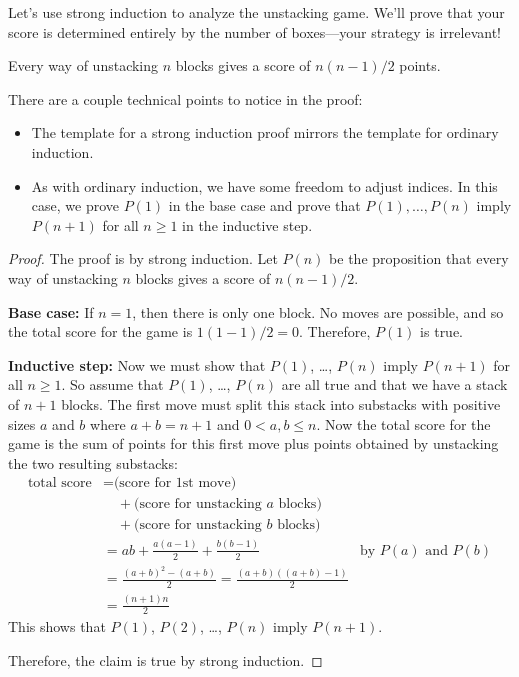 Let's use strong induction to analyze the unstacking game.  We'll prove
that your score is determined entirely by the number of boxes---your
strategy is irrelevant!

\begin{theorem}\label{stacking}
Every way of unstacking $n$ blocks gives a score of $n(n-1)/2$ points.
\end{theorem}

There are a couple technical points to notice in the proof:

\begin{itemize}

\item The template for a strong induction proof mirrors the template
for ordinary induction.

\item As with ordinary induction, we have some freedom to adjust indices.
In this case, we prove $P(1)$ in the base case and prove that $P(1),
\dots, P(n)$ imply $P(n+1)$ for all $n \geq 1$ in the inductive step.

\end{itemize}

\begin{proof}
The proof is by strong induction.  Let $P(n)$ be the proposition that
every way of unstacking $n$ blocks gives a score of $n(n-1)/2$.

\textbf{Base case:} If $n = 1$, then there is only one
block.  No moves are possible, and so the total score for the game is
$1(1 - 1)/2 = 0$.  Therefore, $P(1)$ is true.

\textbf{Inductive step:} Now we must show that $P(1)$, \dots, $P(n)$ imply
$P(n+1)$ for all $n \geq 1$.  So assume that $P(1)$, \dots, $P(n)$ are all
true and that we have a stack of $n+1$ blocks.  The first move must split
this stack into substacks with positive sizes $a$ and $b$ where $a+b =
n+1$ and $0<a,b\leq n$.  Now the total score for the game is the sum of
points for this first move plus points obtained by unstacking the two
resulting substacks:
%
\begin{align*}
\text{total score}
    & = \text{(score for 1st move)} \\
    & \quad + \text{(score for unstacking $a$ blocks)} \\
    & \quad + \text{(score for unstacking $b$ blocks)} \\
    & = ab + \frac{a(a-1)}{2} + \frac{b(b-1)}{2} & \text{by $P(a)$ and $P(b)$}\\
    & = \frac{(a+b)^2-(a+b)}{2} = \frac{(a+b)((a+b)-1)}{2}\\
    & = \frac{(n+1)n}{2}
\end{align*}
%
This shows that $P(1)$, $P(2)$, \dots, $P(n)$ imply $P(n+1)$.

Therefore, the claim is true by strong induction.
\end{proof}

